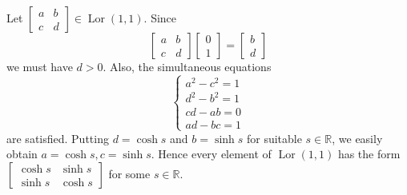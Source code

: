 \documentclass[10pt, letterpaper]{article}
\begin{document}
Let $\left[\begin{array}{ll}a & b \\ c & d\end{array}\right] \in \operatorname{Lor}(1,1)$. Since
$$
\left[\begin{array}{ll}
a & b \\
c & d
\end{array}\right]\left[\begin{array}{l}
0 \\
1
\end{array}\right]=\left[\begin{array}{l}
b \\
d
\end{array}\right]
$$
we must have $d>0$. Also, the simultaneous equations
$$
\left\{\begin{array}{l}
a^{2}-c^{2}=1 \\
d^{2}-b^{2}=1 \\
c d-a b=0 \\
a d-b c=1
\end{array}\right.
$$
are satisfied. Putting $d=\cosh s$ and $b=\sinh s$ for suitable $s \in \mathbb{R}$, we easily obtain $a=\cosh s, c=\sinh s$. Hence every element of $\operatorname{Lor}(1,1)$ has the form $\left[\begin{array}{ll}\cosh s & \sinh s \\ \sinh s & \cosh s\end{array}\right]$ for some $s \in \mathbb{R}$.
\end{document}

